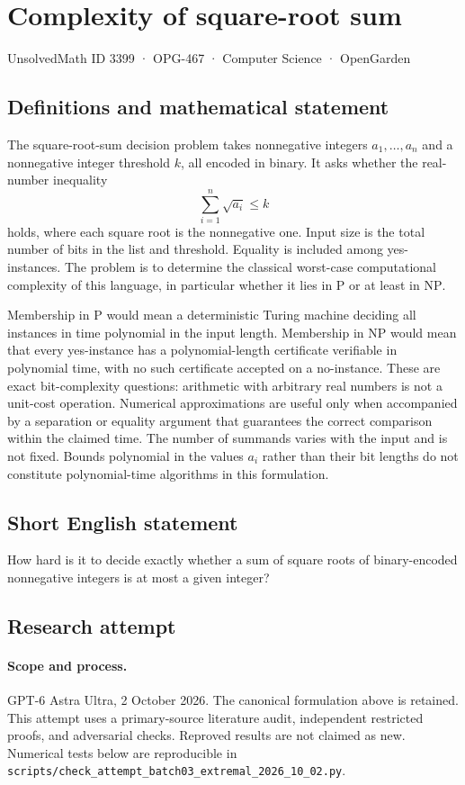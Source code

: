 \documentclass[11pt,a4paper]{article}
\begin{document}
\section*{Complexity of square-root sum}\label{3399}
{\small UnsolvedMath ID 3399 · OPG-467 · Computer Science · OpenGarden}
\subsection{Definitions and mathematical statement}
The square-root-sum decision problem takes nonnegative integers
$a_1,\ldots,a_n$ and a nonnegative integer threshold $k$, all encoded
in binary. It asks whether the real-number inequality
\[
                            \sum_{i=1}^n\sqrt{a_i}\le k
\]
holds, where each square root is the nonnegative one. Input size is
the total number of bits in the list and threshold. Equality is
included among yes-instances. The problem is to determine the
classical worst-case computational complexity of this language,
in particular whether it lies in $\mathrm P$ or at least in
$\mathrm{NP}$.

Membership in $\mathrm P$ would mean a deterministic Turing machine
deciding all instances in time polynomial in the input length.
Membership in $\mathrm{NP}$ would mean that every yes-instance has
a polynomial-length certificate verifiable in polynomial time, with
no such certificate accepted on a no-instance.
These are exact bit-complexity questions: arithmetic with arbitrary
real numbers is not a unit-cost operation. Numerical approximations
are useful only when accompanied by a separation or equality argument
that guarantees the correct comparison within the claimed time.
The number of summands varies with the input and is not fixed.
Bounds polynomial in the values $a_i$ rather than their bit lengths
do not constitute polynomial-time algorithms in this formulation.
\subsection{Short English statement}
How hard is it to decide exactly whether a sum of square roots of binary-encoded nonnegative integers is at most a given integer?
\subsection{Research attempt}
\paragraph{Scope and process.}
GPT-6 Astra Ultra, 2 October 2026. The canonical formulation above is retained. This attempt uses a primary-source literature audit, independent restricted proofs, and adversarial checks. Reproved results are not claimed as new. Numerical tests below are reproducible in \texttt{scripts/check\_attempt\_batch03\_extremal\_2026\_10\_02.py}.
\end{document}
